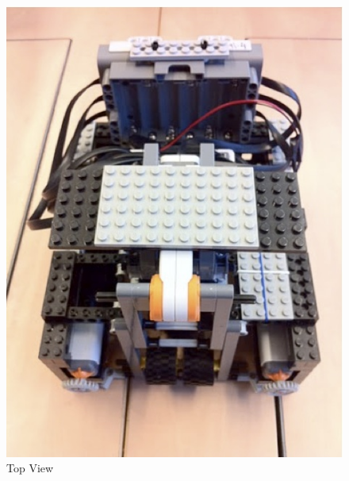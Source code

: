\documentclass[12pt, a4paper, titlepage]{article}
\begin{document}
\begin{figure}[h]
\begin{minipage}[b]{0.5\linewidth}
\centering
\includegraphics[scale=0.8]{images/robot/topview.jpg}
\caption{Top View}
\label{fig:topview}
\end{minipage}
\hspace{0.5cm}
\begin{minipage}[b]{0.5\linewidth}
\centering

\end{minipage}
\end{figure}
\end{document}
